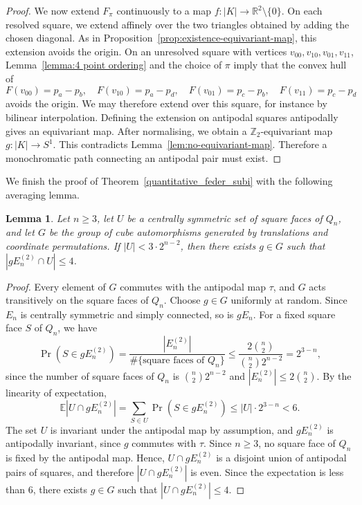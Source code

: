\documentclass[12pt,UKenglish]{amsart}
\theoremstyle{plain}
\newtheorem{lemma}[lemma]{Lemma}
\theoremstyle{definition}
\theoremstyle{remark}
\begin{document}
\begin{proof}
We now extend $F_\pi$ continuously to a map $f:|K|\to \mathbb R^2\setminus\{0\}$. On each resolved square, we extend affinely over the two triangles obtained by adding the chosen diagonal. As in Proposition~\ref{prop:existence-equivariant-map}, this extension avoids the origin. On an unresolved square with vertices $v_{00},v_{10},v_{01},v_{11}$, Lemma~\ref{lemma:4 point ordering} and the choice of $\pi$ imply that the convex hull of
\[
F(v_{00})=p_a-p_b,\quad
F(v_{10})=p_a-p_d,\quad
F(v_{01})=p_c-p_b,\quad
F(v_{11})=p_c-p_d
\]
avoids the origin. We may therefore extend over this square, for instance by bilinear interpolation. Defining the extension on antipodal squares antipodally gives an equivariant map. After normalising, we obtain a $\mathbb Z_2$-equivariant map $g:|K|\to S^1$. This contradicts Lemma~\ref{lem:no-equivariant-map}. Therefore a monochromatic path connecting an antipodal pair must exist.
\end{proof}
We finish the proof of Theorem~\ref{quantitative_feder_subi} with the following averaging lemma.
\begin{lemma}\label{lem:avg}
Let $n\ge3$, let \(U\) be a centrally symmetric set of square faces of \(Q_n\), and let \(G\) be the group of cube automorphisms generated by translations and coordinate permutations. If \(|U|<3\cdot2^{n-2}\), then there exists $g\in G$ such that $|gE_n^{(2)}\cap U|\le 4$.
\end{lemma}
\begin{proof}

Every element of \(G\) commutes with the antipodal map \(\tau\), and \(G\) acts transitively on the square faces of \(Q_n\).
Choose \(g\in G\) uniformly at random. Since \(E_n\) is centrally symmetric and simply connected, so is \(gE_n\). For a fixed square face \(S\) of \(Q_n\), we have
\[
\Pr(S\in gE_n^{(2)})=
\frac{|E_n^{(2)}|}{\#\{\text{square faces of }Q_n\}}\leq\frac{2\binom n2}{\binom n2 2^{n-2}}
=
2^{3-n},
\]
 since the number of square faces of \(Q_n\) is
\(
\binom n2 2^{n-2}\) and \(|E_n^{(2)}|\le 2\binom n2\). By the linearity of expectation,
\[
\mathbb E |U\cap gE_n^{(2)}|
=
\sum_{S\in U}\Pr(S\in gE_n^{(2)})
\le
|U|\cdot2^{3-n}
<6.
\]
The set \(U\) is invariant under the antipodal map by assumption, and \(gE_n^{(2)}\) is antipodally invariant, since $g$ commutes with $\tau$. Since \(n\ge 3\), no square face of \(Q_n\) is fixed by the antipodal map. Hence, \(U\cap gE_n^{(2)}\) is a disjoint union of antipodal pairs of squares, and therefore
$|U\cap gE_n^{(2)}|$ is even. Since the expectation is less than \(6\), there exists \(g\in G\) such that
\(
|U\cap gE_n^{(2)}|\leq 4.
\)
\end{proof}
\end{document}
